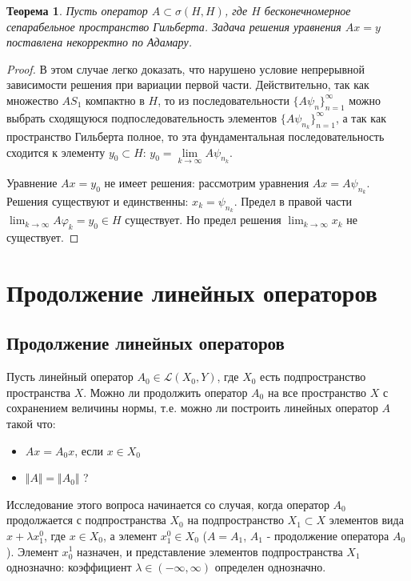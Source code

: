 \documentclass[12pt,a4paper,titlepage,oneside]{book}
\theoremstyle{definition}
\theoremstyle{plain}
\newtheorem*{theorem}{Теорема}
\theoremstyle{break}
\theoremstyle{remark}
\theoremstyle{remark}
\theoremstyle{remark}
\theoremstyle{remark}
\theoremstyle{plain}
\theoremstyle{plain}
\begin{document}
\begin{theorem}
Пусть оператор $A \subset \sigma (H,H)$, где $H$ бесконечномерное сепарабельное пространство Гильберта. Задача решения уравнения $Ax=y$ поставлена некорректно по Адамару.
\end{theorem}

\begin{proof}
В этом случае легко доказать, что нарушено условие непрерывной зависимости решения при вариации первой части. Действительно, так как множество $AS_1$ компактно в $H$, то из последовательности $\lbrace A \psi_n\rbrace_{n=1}^{\infty}$ можно выбрать сходящуюся подпоследовательность элементов $\lbrace A \psi_{n_k}\rbrace_{n=1}^{\infty}$, а так как пространство Гильберта полное, то эта фундаментальная последовательность сходится к элементу $y_0 \subset H$: $y_0=\underset{k \to \infty}{\lim} A \psi_{n_k}$.

Уравнение $Ax = y_0$ не имеет решения: рассмотрим уравнения $Ax = A \psi_{n_k}$. Решения существуют и единственны: $x_k = \psi_{n_k}$. Предел в правой части $\displaystyle\lim_{k \to \infty} A \varphi_k = y_0 \in H$ существует. Но предел решения $\displaystyle\lim_{k \to \infty} x_k$ не существует.
\end{proof}

\chapter{Продолжение линейных операторов}

\section{Продолжение линейных операторов}
Пусть линейный оператор $A_0\in \mathcal{L}(X_0,Y)$, где $X_0$ есть подпространство пространства $X$. Можно ли продолжить оператор $A_0$ на все пространство $X$ с сохранением величины нормы, т.е. можно ли построить линейных оператор $A$ такой что:
\begin{itemize}
 \item $Ax = A_0x$, если $x\in X_0$
 \item $\Vert A \Vert = \Vert A_0 \Vert$ ?
\end{itemize}


Исследование этого вопроса начинается со случая, когда оператор $A_0$ продолжается с подпространства $X_0$ на подпространство $X_1\subset X$ элементов вида $x+\lambda x_1^0$, где $x\in X_0$, а элемент $x_1^0 \in X_0$ ($A = A_1$, $A_1$ - продолжение оператора $A_0$). Элемент $x_0^1$ назначен, и представление элементов подпространства $X_1$ однозначно: коэффициент $\lambda \in (-\infty , \infty)$ определен однозначно. 
\end{document}
